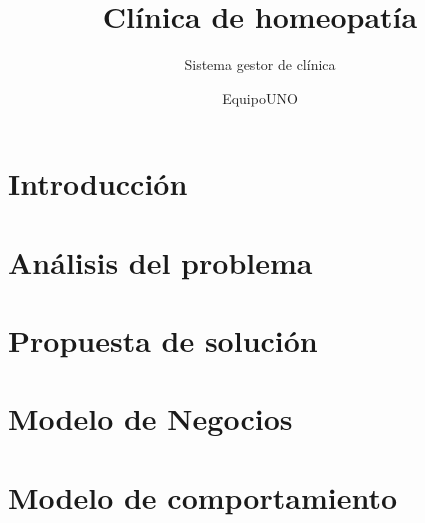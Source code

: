 \documentclass[oneside,10pt]{book}
\title{Clínica de homeopatía}
\subtitle{Sistema gestor de clínica}
\author{EquipoUNO}
\begin{document}
\maketitle
\thispagestyle{empty}

\frontmatter
\tableofcontents

\mainmatter

\chapter{Introducción}


\chapter{Análisis del problema}


\chapter{Propuesta de solución}




\chapter{Modelo de Negocios}


\chapter{Modelo de comportamiento}
	
\end{document}
